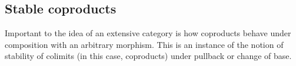\subsection{Stable coproducts}
\label{sec:stable-coproducts}

Important to the idea of an extensive category is how coproducts behave under composition with an arbitrary
morphism. This is an instance of the notion of stability of colimits (in this case, coproducts) under
pullback or change of base.

